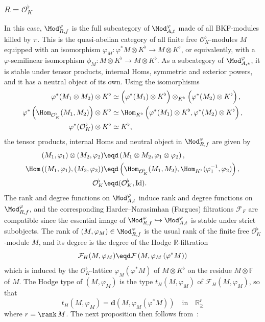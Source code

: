 \subsubsection{\texorpdfstring{$R=\mathcal{O}_{K}^{\flat}$}{R=OK flat}}\label{subsec:RisOkflat}

In this case, $\Mod_{R,f}^{\varphi}$ is the full subcategory of $\Mod_{A,t}^{\varphi}$ made of all BKF-modules killed by $\pi$. This is the quasi-abelian category of all finite free $\mathcal{O}_{K}^{\flat}$-modules $M$ equipped with an isomorphism $\varphi_{M}:\varphi^{\ast}M\otimes K^{\flat}\rightarrow M\otimes K^{\flat}$, or equivalently, with a $\varphi$-semilinear isomorphism $\phi_{M}:M\otimes K^{\flat}\rightarrow M\otimes K^{\flat}$. As a subcategory of $\Mod_{A,\ast}^{\varphi}$, it is stable under tensor products, internal Homs, symmetric and exterior powers, and it has a neutral object of its own. Using the isomorphisms
\begin{align*}
\varphi^{\ast}(M_{1}\otimes M_{2})\otimes K^{\flat} & \simeq \left(\varphi^{\ast}(M_{1})\otimes K^{\flat}\right)\otimes_{K^{\flat}}\left(\varphi^{\ast}(M_{2})\otimes K^{\flat}\right),\\
\varphi^{\ast}\left(\Hom_{\mathcal{O}_{K}^{\flat}}(M_{1},M_{2})\right)\otimes K^{\flat} & \simeq \Hom_{K^{\flat}}\left(\varphi^{\ast}(M_{1})\otimes K^{\flat},\varphi^{\ast}(M_{2})\otimes K^{\flat}\right),\\
\varphi^{\ast}(\mathcal{O}_{K}^{\flat})\otimes K^{\flat} & \simeq K^{\flat},
\end{align*}
the tensor products, internal Homs and neutral object in $\Mod_{R,f}^{\varphi}$ are given by
\begin{align*}
(M_{1},\varphi_{1})\otimes(M_{2},\varphi_{2}) & \eqd \left(M_{1}\otimes M_{2},\varphi_{1}\otimes\varphi_{2}\right),\\
\Hom\left((M_{1},\varphi_{1}),(M_{2},\varphi_{2})\right) & \eqd \left(\Hom_{\mathcal{O}_{K}^{\flat}}(M_{1},M_{2}),\Hom_{K^{\flat}}(\varphi_{1}^{-1},\varphi_{2})\right),\\
\mathcal{O}_{K}^{\flat} & \eqd (\mathcal{O}_{K}^{\flat},\mathrm{Id}).
\end{align*}
The rank and degree functions on $\Mod_{A,t}^{\varphi}$ induce rank and degree functions on $\Mod_{R,f}^{\varphi}$, and the corresponding Harder--Narasimhan (Fargues) filtrations $\mathcal{F}_{F}$ are compatible since the essential image of $\Mod_{R,f}^{\varphi}\hookrightarrow\Mod_{A,t}^{\varphi}$ is stable under strict subobjects. The rank of $(M,\varphi_{M})\in\Mod_{R,f}^{\varphi}$ is the usual rank of the finite free $\mathcal{O}_{K}^{\flat}$-module $M$, and its degree is the degree of the Hodge $\mathbb{R}$-filtration
\[
\mathcal{F}_{H}(M,\varphi_{M})\eqd\mathcal{F}\left(M,\varphi_{M}\left(\varphi^{\ast}M\right)\right)
\]
which is induced by the $\mathcal{O}_{K}^{\flat}$-lattice $\varphi_{M}(\varphi^{\ast}M)$ of $M\otimes K^{\flat}$ on the residue $M\otimes\mathbb{F}$ of $M$. The Hodge type of $(M,\varphi_{M})$ is the type $t_{H}(M,\varphi_{M})$ of $\mathcal{F}_{H}(M,\varphi_{M})$, so that
\[
t_{H}(M,\varphi_{M})=\mathbf{d}\left(M,\varphi_{M}(\varphi^{\ast}M)\right)\quad\text{in}\quad\mathbb{R}_{\geq}^{r}
\]
where $r=\rank\,M$. The next proposition then follows from~\cite[\S 5.3]{Co16}:


